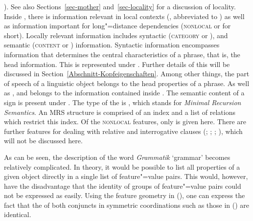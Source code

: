 \citeyear[]{ps2}). See also Sections~\ref{sec-mother} and~\ref{sec-locality} for a
discussion of locality. Inside \synsem, there is information relevant in local contexts (\local,
abbreviated to \loc) as well as information important for long"=distance dependencies
(\textsc{nonlocal} or \nonloc for short). Locally relevant information includes syntactic
(\textsc{category} or \cat), and semantic (\textsc{content} or \cont) information. Syntactic
information encompasses information that determines the central characteristics of a phrase, that
is, the head information. This is represented under \head. Further details of this will be discussed in
 Section~\ref{Abschnitt-Kopfeigenschaften}. Among other things, the part of speech of a 
 linguistic object belongs to the head properties of a phrase. As well as \head, \spr and \comps belongs to the information contained inside \cat. The semantic content
 of a sign is present under \cont. The type of the \contv is , which stands for \emph{Minimal Recursion
Semantics}\indexmrs \citep*{CFPS2005a}. An MRS structure is comprised of an index and a list of
relations which restrict this index. Of the \textsc{nonlocal} features, only \slasch is given here. There are further features for dealing with relative
and interrogative clauses (\citealp{ps2}; \citealp{Sag97a};
\citealp{GSag2000a-u}; \citealp{Holler2005a-u}), which will not be discussed here.

As can be seen, the description of the word \emph{Grammatik} `grammar' becomes relatively complicated. In theory, it would be possible to list all properties
of a given object directly in a single list of feature"=value pairs. This would, however, have the disadvantage that the identity of groups of feature"=value pairs could not be
expressed as easily. Using the feature geometry in (), one can express the fact that the \catvs of both conjuncts in symmetric coordinations
such as those in () are identical.\label{Seite-HPSG-Koordination}

